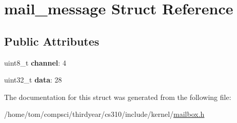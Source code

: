\hypertarget{structmail__message}{}\section{mail\+\_\+message Struct Reference}
\label{structmail__message}
\subsection*{Public Attributes}
\begin{DoxyCompactItemize}
\item 
\mbox{\label{structmail__message_ae8477731f3ed1cb7eab487ea07cafb35}} 
uint8\+\_\+t {\bfseries channel}\+: 4
\item 
\mbox{\label{structmail__message_aba4c68307e74fd1d8ec30af932720f12}} 
uint32\+\_\+t {\bfseries data}\+: 28
\end{DoxyCompactItemize}


The documentation for this struct was generated from the following file\+:\begin{DoxyCompactItemize}
\item 
/home/tom/compsci/thirdyear/cs310/include/kernel/\mbox{\hyperlink{mailbox_8h}{mailbox.\+h}}\end{DoxyCompactItemize}
